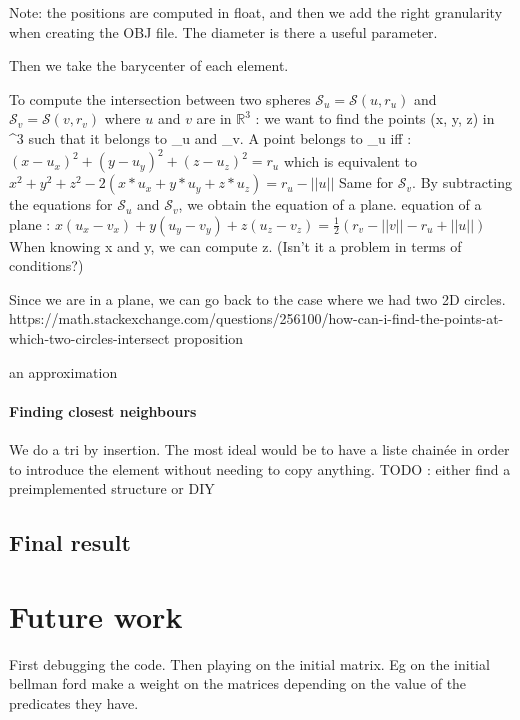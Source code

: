 \documentclass{article}
\begin{document}
Note: the positions are computed in float, and then we add the right granularity when creating the OBJ file. The diameter is there a useful parameter. 

Then we take the barycenter of each element. 

To compute the intersection between two spheres $\mathcal{S}_{u} = \mathcal{S}(u, r_{u})$ and $\mathcal{S}_{v} = \mathcal{S}(v, r_{v})$ where $u$ and $v$ are in $\mathbb{R}^3$ :
we want to find the points (x, y, z) in ^{3} such that it belongs to _{u} and _{v}. 
A point belongs to _{u} iff : 
$ (x-u_{x})^2 + (y - u_{y})^2 + (z - u_{z})^2 = r_{u}$
which is equivalent to \\
$x^2+ y^2+z^2 - 2 (x * u_{x} + y * u_{y} + z * u_{z}) = r_{u} - ||u||$
Same for $\mathcal{S}_v$.  
By subtracting the equations for $\mathcal{S}_u$ and $\mathcal{S}_v$, we obtain the equation of a plane. 
equation of a plane : 
$x(u_{x} - v_{x}) + y (u_{y} - v_{y}) + z (u_{z} - v_{z}) = \frac{1}{2} (r_{v} - ||v|| - r_{u} + ||u||)$
When knowing x and y, we can compute z. (Isn't it a problem in terms of conditions?)

Since we are in a plane, we can go back to the case where we had two 2D circles.  
https://math.stackexchange.com/questions/256100/how-can-i-find-the-points-at-which-two-circles-intersect proposition

an approximation


\paragraph{Finding closest neighbours}
We do a tri by insertion. 
The most ideal would be to have a liste chainée in order to introduce the element without needing to copy anything. 
TODO : either find a preimplemented structure or DIY






\subsection{Final result}



\section{Future work}
First debugging the code.
Then playing on the initial matrix. Eg on the initial bellman ford make a weight on the matrices depending on the value of the predicates they have. 

\printbibliography[
heading=bibintoc,
title={Bibliography}
]
\end{document}
